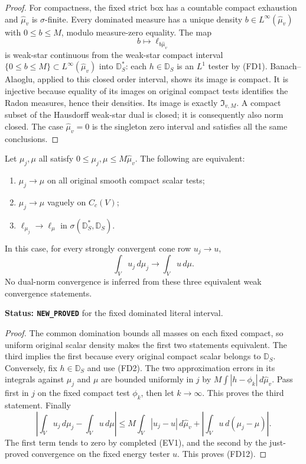 \begin{proof}
For compactness, the fixed strict box has a countable compact
exhaustion and $\widehat\mu_v$ is $\sigma$-finite. Every dominated
measure has a unique density $b\in L^\infty(\widehat\mu_v)$
with $0\leq b\leq M$, modulo measure-zero equality. The map
\[
 b\longmapsto \ell_{b\widehat\mu_v}
 \tag{FD11}
\]
is weak-star continuous from the weak-star compact interval
$\{0\leq b\leq M\}\subset L^\infty(\widehat\mu_v)$ into
$\mathbb D_S^*$: each $h\in\mathbb D_S$ is an $L^1$ tester
by \textup{(FD1)}. Banach--Alaoglu, applied to this closed order
interval, shows its image is compact. It is injective because
equality of its images on original compact tests identifies
the Radon measures, hence their densities. Its image is exactly
$\mathfrak I_{v,M}$. A compact subset of the Hausdorff weak-star
dual is closed; it is consequently also norm closed. The case
$\widehat\mu_v=0$ is the singleton zero interval and satisfies
all the same conclusions.
\end{proof}

\begin{proposition}
\label{prop:r12-fixed-domination-moving-testers}
Let $\mu_j,\mu$ all satisfy
$0\leq\mu_j,\mu\leq M\widehat\mu_v$. The following are
equivalent:
\begin{enumerate}
\item $\mu_j\to\mu$ on all original smooth compact scalar tests;
\item $\mu_j\to\mu$ vaguely on $C_c(V)$;
\item $\ell_{\mu_j}\to\ell_\mu$ in
$\sigma(\mathbb D_S^*,\mathbb D_S)$.
\end{enumerate}
In this case, for every strongly convergent cone row $u_j\to u$,
\[
                  \int_Vu_j\,d\mu_j
                         \longrightarrow\int_Vu\,d\mu.
 \tag{FD12}
\]
No dual-norm convergence is inferred from these three equivalent
weak convergence statements.
\end{proposition}

\noindent\textbf{Status: \texttt{NEW\_PROVED}} for the
fixed dominated literal interval.

\begin{proof}
The common domination bounds all masses on each fixed compact,
so uniform original scalar density makes the first two statements
equivalent. The third implies the first because every original
compact scalar belongs to $\mathbb D_S$.
Conversely, fix $h\in\mathbb D_S$ and use \textup{(FD2)}.
The two approximation errors in its integrals against $\mu_j$
and $\mu$ are bounded uniformly in $j$ by
$M\int|h-\phi_k|\,d\widehat\mu_v$. Pass first in $j$ on the
fixed compact test $\phi_k$, then let $k\to\infty$.
This proves the third statement. Finally
\[
 \left|\int_Vu_j\,d\mu_j-\int_Vu\,d\mu\right|
 \leq M\int_V|u_j-u|\,d\widehat\mu_v
         +\left|\int_Vu\,d(\mu_j-\mu)\right|.
\]
The first term tends to zero by completed \textup{(EV1)}, and
the second by the just-proved convergence on the fixed energy
tester $u$. This proves \textup{(FD12)}.
\end{proof}

